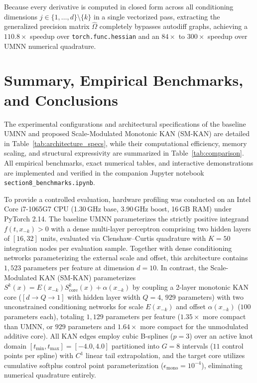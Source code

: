 \documentclass[11pt,a4paper]{article}
\theoremstyle{plain}
\theoremstyle{definition}
\theoremstyle{remark}
\begin{document}
Because every derivative is computed in closed form across all conditioning dimensions $j \in \{1, \dots, d\} \setminus \{k\}$ in a single vectorized pass, extracting the generalized precision matrix $\widehat{\Omega}$ completely bypasses autodiff graphs, achieving a $110.8\times$ speedup over \texttt{torch.func.hessian} and an $84\times$ to $300\times$ speedup over UMNN numerical quadrature.

\section{Summary, Empirical Benchmarks, and Conclusions}
\label{sec:empirical_evaluation}
The experimental configurations and architectural specifications of the baseline UMNN and proposed Scale-Modulated Monotonic KAN (SM-KAN) are detailed in Table~\ref{tab:architecture_specs}, while their computational efficiency, memory scaling, and structural expressivity are summarized in Table~\ref{tab:comparison}. All empirical benchmarks, exact numerical tables, and interactive demonstrations are implemented and verified in the companion Jupyter notebook \texttt{section8\_benchmarks.ipynb}.

To provide a controlled evaluation, hardware profiling was conducted on an Intel Core i7-1065G7 CPU (1.30\,GHz base, 3.90\,GHz boost, 16\,GB RAM) under PyTorch 2.14. The baseline UMNN parameterizes the strictly positive integrand $f(t, x_{-k}) > 0$ with a dense multi-layer perceptron comprising two hidden layers of $[16, 32]$ units, evaluated via Clenshaw--Curtis quadrature with $K = 50$ integration nodes per evaluation sample. Together with dense conditioning networks parameterizing the external scale and offset, this architecture contains $1{,}523$ parameters per feature at dimension $d=10$. In contrast, the Scale-Modulated KAN (SM-KAN) parameterizes $S^k(x) = E(x_{-k}) S^k_{\text{core}}(x) + \alpha(x_{-k})$ by coupling a 2-layer monotonic KAN core ($[d \to Q \to 1]$ with hidden layer width $Q = 4$, $929$ parameters) with two unconstrained conditioning networks for scale $E(x_{-k})$ and offset $\alpha(x_{-k})$ ($100$ parameters each), totaling $1{,}129$ parameters per feature ($1.35\times$ more compact than UMNN, or $929$ parameters and $1.64\times$ more compact for the unmodulated additive core). All KAN edges employ cubic B-splines ($p = 3$) over an active knot domain $[t_{\min}, t_{\max}] = [-4.0, 4.0]$ partitioned into $G = 8$ intervals ($11$ control points per spline) with $C^1$ linear tail extrapolation, and the target core utilizes cumulative softplus control point parameterization ($\epsilon_{\text{mono}} = 10^{-4}$), eliminating numerical quadrature entirely.
\end{document}
